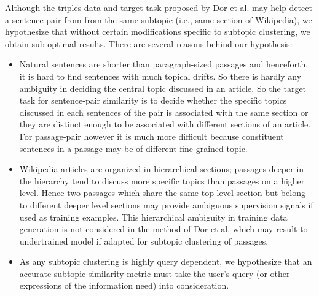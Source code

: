 Although the triples data and target task proposed by Dor et al. may help detect a sentence pair from from the same subtopic (i.e., same section of Wikipedia), we hypothesize that without certain modifications specific to subtopic clustering, we obtain sub-optimal results. There are several reasons behind our hypothesis: 
\begin{itemize}
    \item Natural sentences are shorter than paragraph-sized  passages and henceforth, it is hard to find sentences with much topical drifts. So there is hardly any ambiguity in deciding the central topic discussed  in an article. So the target task for sentence-pair similarity is to decide whether the specific topics discussed in each sentences of the pair is associated with the same section or they are distinct enough to be associated with different sections  of an article. For passage-pair however it is much more difficult because constituent sentences in a passage may be of different fine-grained topic.
    \item Wikipedia articles are organized in hierarchical sections; passages deeper in the hierarchy tend to discuss more specific topics than passages on a higher level. Hence two passages which share the same top-level section but belong to different deeper level sections may provide ambiguous supervision signals if used as training examples. This hierarchical ambiguity in training data generation is not considered in the method of Dor et al. which may result to undertrained model if adapted for subtopic clustering of passages.
    \item As any subtopic clustering is highly query dependent, we hypothesize that an accurate subtopic similarity metric must take the user's query (or other expressions of the information need) into consideration.
\end{itemize}

